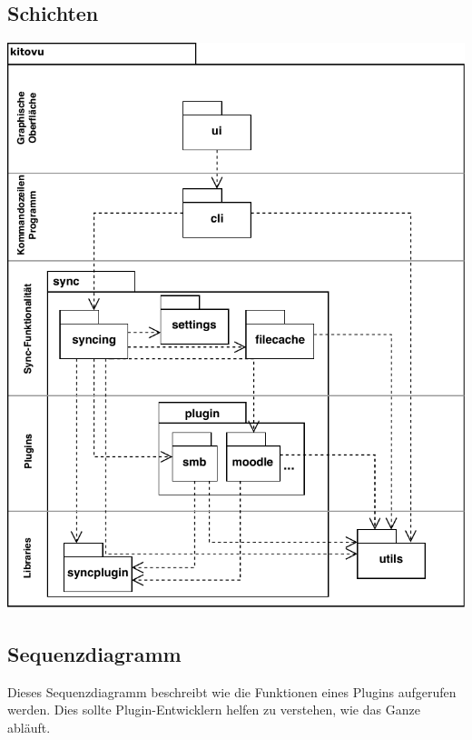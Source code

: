 \documentclass[a4paper]{article}
\begin{document}


\subsection{Schichten}

\includegraphics[width=40em]{./img/schichtendiagramm.pdf}

\newpage

\subsection{Sequenzdiagramm}

Dieses Sequenzdiagramm beschreibt wie die Funktionen eines Plugins aufgerufen werden.
Dies sollte Plugin-Entwicklern helfen zu verstehen, wie das Ganze abläuft.
\end{document}
